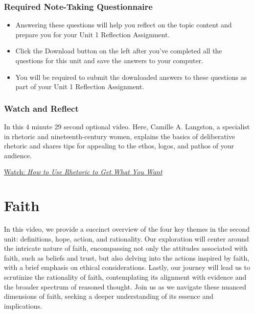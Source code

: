 \documentclass[
]{book}
\providecommand{\tightlist}{%
  \setlength{\itemsep}{0pt}\setlength{\parskip}{0pt}}
\begin{document}
\hypertarget{required-note-taking-questionnaire-3}{%
\subsection*{Required Note-Taking Questionnaire}\label{required-note-taking-questionnaire-3}}

\begin{reflect}
\begin{itemize}
\tightlist
\item
  Answering these questions will help you reflect on the topic content and prepare you for your Unit 1 Reflection Assignment.
\item
  Click the Download button on the left after you've completed all the questions for this unit and save the answers to your computer.
\item
  You will be required to submit the downloaded answers to these questions as part of your Unit 1 Reflection Assignment.
\end{itemize}
\end{reflect}

\hypertarget{watch-and-reflect-7}{%
\subsection*{Watch and Reflect}\label{watch-and-reflect-7}}

\begin{reflect}
In this 4 minute 29 second optional video. Here, Camille A. Langston, a specialist in rhetoric and nineteenth-century women, explains the basics of deliberative rhetoric and shares tips for appealing to the ethos, logos, and pathos of your audience.

\href{https://www.youtube.com/watch?v=3klMM9BkW5o}{Watch: \emph{How to Use Rhetoric to Get What You Want}}
\end{reflect}

\hypertarget{faith}{%
\chapter{Faith}\label{faith}}

In this video, we provide a succinct overview of the four key themes in the second unit: definitions, hope, action, and rationality. Our exploration will center around the intricate nature of faith, encompassing not only the attitudes associated with faith, such as beliefs and trust, but also delving into the actions inspired by faith, with a brief emphasis on ethical considerations. Lastly, our journey will lead us to scrutinize the rationality of faith, contemplating its alignment with evidence and the broader spectrum of reasoned thought. Join us as we navigate these nuanced dimensions of faith, seeking a deeper understanding of its essence and implications.
\end{document}
